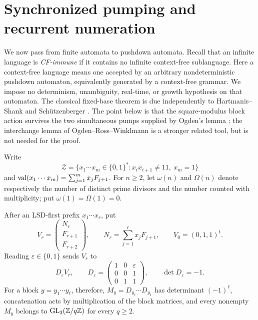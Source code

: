 \section{Synchronized pumping and recurrent numeration}
\label{sec:context-free-pisot}

We now pass from finite automata to pushdown automata. Recall that an
infinite language is \emph{CF-immune} if it contains no infinite
context-free sublanguage. Here a context-free language means one accepted
by an arbitrary nondeterministic pushdown automaton, equivalently generated
by a context-free grammar. We impose no determinism, unambiguity,
real-time, or growth hypothesis on that automaton. The classical
fixed-base theorem is due independently to Hartmanis--Shank and
Sch\"utzenberger
\cite{HartmanisShank1968,Schutzenberger1968}. The point below is that
the square-modulus block action survives the two simultaneous pumps
supplied by Ogden's lemma \cite{Ogden1968}; the interchange lemma of
Ogden--Ross--Winklmann \cite{OgdenRossWinklmann1985} is a stronger
related tool, but is not needed for the proof.

Write
\[
  \mathcal Z=\{x_1\cdots x_m\in\{0,1\}^\ast:
      x_ix_{i+1}\ne11,\ x_m=1\}
\]
and \(\operatorname{val}(x_1\cdots x_m)=\sum_{j=1}^m x_jF_{j+1}\).
For \(n\ge2\), let \(\omega(n)\) and \(\Omega(n)\) denote respectively
the number of distinct prime divisors and the number counted with
  multiplicity; put \(\omega(1)=\Omega(1)=0\).

\begin{lemma}
  \label{lem:main-zeckendorf-unimodular-block-action}
  After an LSD-first prefix \(x_1\cdots x_r\), put
  \[
    V_r=\begin{pmatrix}N_r\\F_{r+1}\\F_{r+2}\end{pmatrix},
    \qquad N_r=\sum_{j=1}^r x_jF_{j+1},
    \qquad V_0=(0,1,1)^t.
  \]
  Reading \(\varepsilon\in\{0,1\}\) sends \(V_r\) to
  \[
    D_\varepsilon V_r,
    \qquad
    D_\varepsilon=
    \begin{pmatrix}
      1&0&\varepsilon\\
      0&0&1\\
      0&1&1
    \end{pmatrix},
    \qquad \det D_\varepsilon=-1.
  \]
  For a block \(y=y_1\cdots y_\ell\), therefore,
  \(M_y=D_{y_\ell}\cdots D_{y_1}\) has determinant
  \((-1)^\ell\), concatenation acts by multiplication of the block
  matrices, and every nonempty \(M_y\) belongs to
  \(\operatorname{GL}_3(\mathbb{Z}/q\mathbb{Z})\) for every \(q\ge2\).
\end{lemma}

